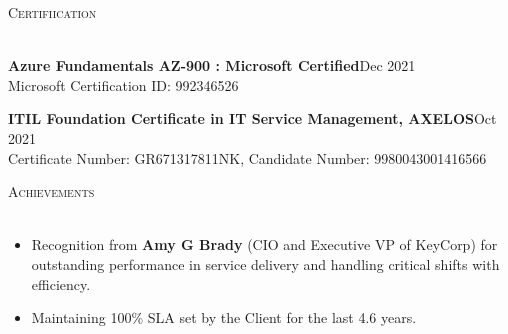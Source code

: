 \documentclass[a4paper]{article}
\newcommand{\lineunder} {
    \vspace*{-8pt} \\
    \hspace*{-18pt} \hrulefill \\
}
\newcommand{\header} [1] {
    {\hspace*{-18pt}\vspace*{6pt} \textsc{#1}}
    \vspace*{-6pt} \lineunder
}
\begin{document}
{\color{blue}\header{Certifiication}}
\vspace{1mm}
\item \textbf{Azure Fundamentals AZ-900 : Microsoft Certified}\hfill Dec 2021\\
Microsoft Certification ID: 992346526\\
\item \textbf{ITIL Foundation Certificate in IT Service Management, AXELOS}\hfill Oct 2021\\
Certificate Number: GR671317811NK, Candidate Number: 9980043001416566\\
\vspace{2mm}

{\color{blue}\header{Achievements}}
\vspace{1mm}
\justify
\begin{itemize} \itemsep 1pt
           \item Recognition from \textbf{Amy G Brady} (CIO and Executive VP of KeyCorp) for outstanding performance in service delivery and handling critical shifts with efficiency. \\
           \item Maintaining 100\%  SLA set by the Client for the last 4.6 years.
\end{itemize}
\vspace{2mm}
\end{document}
